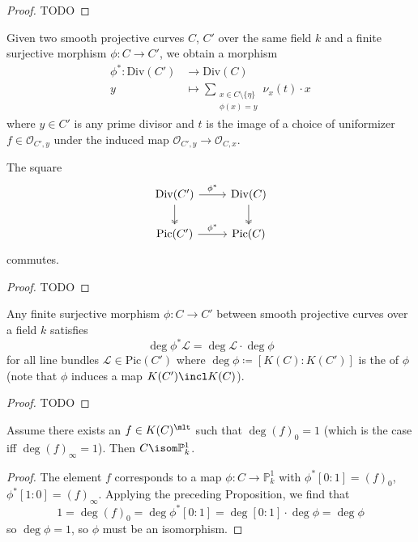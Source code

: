 \documentclass[wip, algebra]{bsteffan-lecturenotes}
\newcommand{\cO}{\mathcal{O}}
\newcommand{\cL}{\mathcal{L}}
\renewcommand{\P}{\mathbb{P}}
\newcommand{\Pic}{\mathrm{Pic}}
\newcommand{\Div}{\mathrm{Div}}
\begin{document}
\begin{proof}
	TODO
\end{proof}
\begin{definition}
	Given two smooth projective curves $C$, $C'$ over the same field $k$ and a finite surjective morphism $\phi\colon C \to C'$, we obtain a morphism
	\begin{align*}
		\phi^*\colon \Div(C') &\to \Div(C) \\
		y &\mapsto \sum_{\substack{x \in C \setminus \{\eta\} \\ \phi(x) = y}} \nu_x(t) \cdot x
	\end{align*}
	where $y \in C'$ is any prime divisor and $t$ is the image of a choice of uniformizer $f \in \cO_{C', y}$ under the induced map $\cO_{C', y} \to \cO_{C, x}$.
\end{definition}
\begin{proposition}
	The square
	\begin{equation*}
		\begin{tikzcd}
			\Div(C')
					\ar[r, "\phi^*"]
					\ar[d, two heads]
				& \Div(C)
					\ar[d, two heads]
			\\
			\Pic(C')
					\ar[r, "\phi^*"]
				& \Pic(C)
		\end{tikzcd}
	\end{equation*}
	commutes.
\end{proposition}
\begin{proof}
	TODO
\end{proof}
\begin{proposition}
	Any finite surjective morphism $\phi\colon C \to C'$ between smooth projective curves over a field $k$ satisfies 
	\begin{equation*}
		\deg \phi^* \cL = \deg \cL \cdot \deg \phi
	\end{equation*}
	for all line bundles $\cL \in \Pic(C')$ where $\deg \phi \coloneq [K(C) : K(C')]$ is the  of $\phi$ (note that $\phi$ induces a map $K(C') \incl K(C)$).
\end{proposition}
\begin{proof}
	TODO
\end{proof}
\begin{corollary}\label{cor:curves:degonerationalsection}
	Assume there exists an $f \in K(C)^\mlt$ such that $\deg (f)_0 = 1$ (which is the case iff $\deg (f)_\infty = 1$).
	Then $C \isom \P^1_k$.
\end{corollary}
\begin{proof}
	The element $f$ corresponds to a map $\phi\colon C \to \P^1_k$ with $\phi^* [0 : 1] = (f)_0$, $\phi^* [1 : 0] = (f)_\infty$.
	Applying the preceding Proposition, we find that 
	\begin{equation*}
		1 = \deg (f)_0 = \deg \phi^* [0 : 1] = \deg [0 : 1] \cdot \deg \phi = \deg \phi
	\end{equation*}
	so $\deg \phi = 1$, so $\phi$ must be an isomorphism.
\end{proof}
\end{document}
